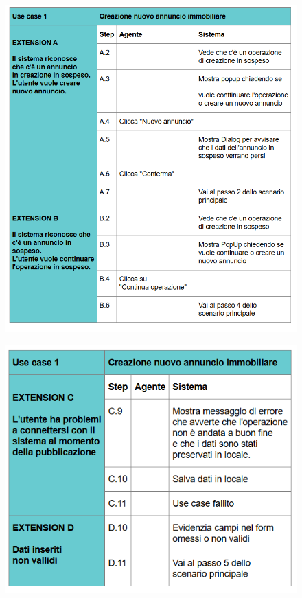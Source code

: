 \begin{figure}[H]
	\centering
	\includegraphics[width=1\linewidth]{"Immagini/cockburn/nuovo annuncio estensioni 1.png"}
	\caption[CockBurn extensions: registra nuovo agente]{}
	\label{fig:registra-nuovo-agente-extensions1}
\end{figure}

\newpage

\begin{figure}[H]
	\centering
	\includegraphics[width=1\linewidth]{"Immagini/cockburn/nuovo annuncio estensioni 2.png"}
	\caption[CockBurn extensions: registra nuovo agente]{}
	\label{fig:registra-nuovo-agente-extensions2}
\end{figure}